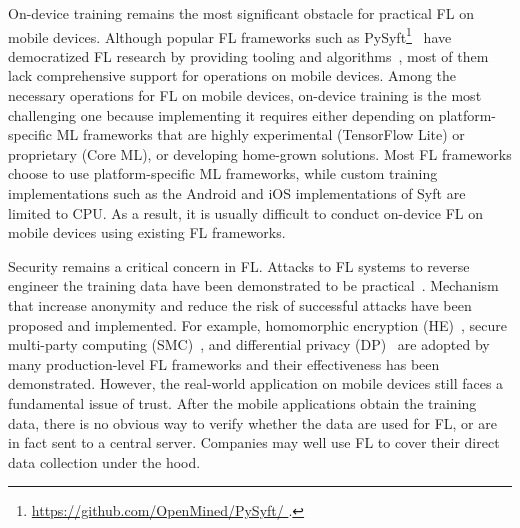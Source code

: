 \documentclass[conference]{IEEEtran}
\begin{document}

On-device training remains the most significant obstacle for
practical FL on mobile devices.
Although popular FL frameworks such as
PySyft\footnote{\url{
    https://github.com/OpenMined/PySyft/
}.}~\cite{ryffel2018generic,Ziller2021,hall2021syft}
have democratized FL research by providing tooling and
algorithms~\cite{sriraman2022device},
most of them lack comprehensive support for operations on mobile devices.
Among the necessary operations for FL on mobile devices,
on-device training is the most challenging one because
implementing it requires either depending on
platform-specific ML frameworks that are highly experimental (TensorFlow Lite)
or proprietary (Core ML),
or developing home-grown solutions.
Most FL frameworks choose to use platform-specific ML frameworks,
while custom training implementations such as
the Android and iOS implementations of Syft are limited to CPU.
As a result, it is usually difficult to conduct on-device FL
on mobile devices using existing FL frameworks.

Security remains a critical concern in FL.
Attacks to FL systems to reverse engineer the training data have been
demonstrated to be practical~\cite{sun2019really}.
Mechanism that increase anonymity and
reduce the risk of successful attacks have been proposed and implemented.
For example,
homomorphic encryption (HE)~\cite{wang2020homo},
secure multi-party computing (SMC)~\cite{bonawitz2016practical}, and
differential privacy
(DP)~\cite{dwork2006differential,geyer2017differentially} are
adopted by many production-level FL frameworks and
their effectiveness has been demonstrated.
However, the real-world application on mobile devices still faces a fundamental
issue of trust.
After the mobile applications obtain the training data,
there is no obvious way to verify whether the data are used for FL,
or are in fact sent to a central server.
Companies may well use FL to cover their direct data collection under the hood.

\printbibliography

\end{document}

